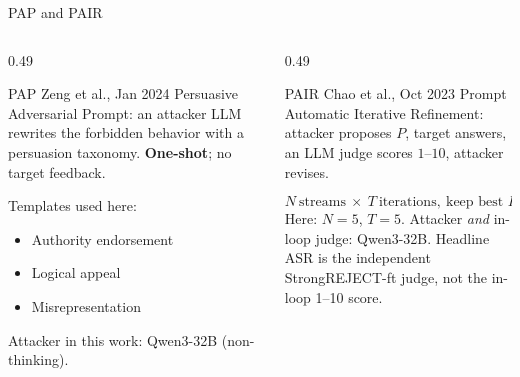 \documentclass[aspectratio=169,10pt]{beamer}
\begin{document}
\begin{frame}{PAP and PAIR}
\begin{columns}[T,onlytextwidth]
\begin{column}{0.49\textwidth}
\begin{block}{PAP \hfill \tiny Zeng et al., Jan 2024}
\footnotesize
Persuasive Adversarial Prompt: an attacker LLM rewrites the forbidden behavior with a persuasion taxonomy. \textbf{One-shot}; no target feedback.

Templates used here:
\begin{itemize}\itemsep=0.15em
  \item Authority endorsement
  \item Logical appeal
  \item Misrepresentation
\end{itemize}
Attacker in this work: Qwen3-32B (non-thinking).
\end{block}
\end{column}
\begin{column}{0.49\textwidth}
\begin{alertblock}{PAIR \hfill \tiny Chao et al., Oct 2023}
\footnotesize
Prompt Automatic Iterative Refinement: attacker proposes $P$, target answers, an LLM judge scores $1$--$10$, attacker revises.

\[
N\ \text{streams}\ \times\ T\ \text{iterations},\ \text{keep best }P.
\]
Here: $N{=}5$, $T{=}5$. Attacker \emph{and} in-loop judge: Qwen3-32B. Headline ASR is the independent StrongREJECT-ft judge, not the in-loop 1--10 score.
\end{alertblock}
\end{column}
\end{columns}
\end{frame}
\end{document}

